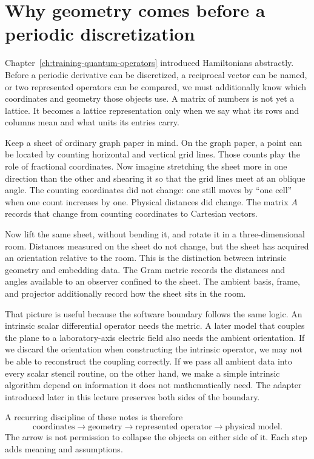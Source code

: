 \section{Why geometry comes before a periodic discretization}

Chapter~\ref{ch:training-quantum-operators} introduced Hamiltonians abstractly.
Before a periodic derivative can be discretized, a reciprocal vector can be
named, or two represented operators can be compared, we must additionally know
which coordinates and geometry those objects use. A matrix of numbers is not
yet a lattice. It becomes a lattice representation only when we say what its
rows and columns mean and what units its entries carry.

Keep a sheet of ordinary graph paper in mind. On the graph paper, a point can
be located by counting horizontal and vertical grid lines. Those counts play
the role of fractional coordinates. Now imagine stretching the sheet more in
one direction than the other and shearing it so that the grid lines meet at an
oblique angle. The counting coordinates did not change: one still moves by
``one cell'' when one count increases by one. Physical distances did change.
The matrix $A$ records that change from counting coordinates to Cartesian
vectors.

Now lift the same sheet, without bending it, and rotate it in a three-dimensional
room. Distances measured on the sheet do not change, but the sheet has acquired
an orientation relative to the room. This is the distinction between intrinsic
geometry and embedding data. The Gram metric records the distances and angles
available to an observer confined to the sheet. The ambient basis, frame, and
projector additionally record how the sheet sits in the room.

That picture is useful because the software boundary follows the same logic.
An intrinsic scalar differential operator needs the metric. A later model that
couples the plane to a laboratory-axis electric field also needs the ambient
orientation. If we discard the orientation when constructing the intrinsic
operator, we may not be able to reconstruct the coupling correctly. If we pass
all ambient data into every scalar stencil routine, on the other hand, we make
a simple intrinsic algorithm depend on information it does not mathematically
need. The adapter introduced later in this lecture preserves both sides of the
boundary.

A recurring discipline of these notes is therefore
\begin{equation}
  \text{coordinates}
  \longrightarrow
  \text{geometry}
  \longrightarrow
  \text{represented operator}
  \longrightarrow
  \text{physical model}.
  \label{eq:training-geometry-layer-sequence}
\end{equation}
The arrow is not permission to collapse the objects on either side of it. Each
step adds meaning and assumptions.


